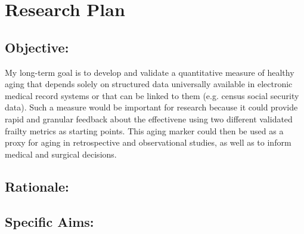 \section{Research Plan }\label{research-plan}


\subsection{Objective:}\label{objective}
  
My long-term goal is to develop and validate a quantitative measure of healthy aging that depends solely on structured data universally available in electronic medical record systems or that can be linked to them (e.g. census social security data). Such a measure would be important for research because it could provide rapid and granular feedback about the effectivene
using two different validated frailty metrics as starting points. This
aging marker could then be used as a proxy for aging in retrospective
and observational studies, as well as to inform medical and surgical
decisions.


\subsection{Rationale:}\label{rationale}

\subsection{Specific Aims:}\label{specific-aims}
